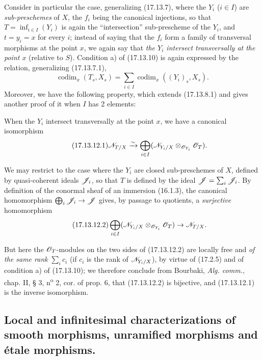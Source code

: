 \begin{env}[17.13.11]\label{IV.17.13.11}
Consider in particular the case, generalizing (17.13.7), where the $Y_i$ ($i\in I$) are \emph{sub-preschemes} of $X$, the $f_i$ being the canonical injections, so that $T=\inf_{i\in I}(Y_i)$ is again the ``intersection'' sub-prescheme of the $Y_i$, and $t=y_i=x$ for every $i$; instead of saying that the $f_i$ form a family of transversal morphisms at the point $x$, we again say that \emph{the $Y_i$ intersect transversally at the point $x$} (relative to $S$). Condition a) of (17.13.10) is again expressed by the relation, generalizing (17.13.7.1),
\[
\label{IV.17.13.11.1}
\tag{17.13.11.1}
\operatorname{codim}_x(T_s,X_s)=\sum_{i\in I}\operatorname{codim}_x((Y_i)_s,X_s).
\]
Moreover, we have the following property, which extends (17.13.8.1) and gives another proof of it when $I$ has 2 elements:
\end{env}

\begin{corollary}[17.13.12]
\label{IV.17.13.12}
When the $Y_i$ intersect transversally at the point $x$, we have a canonical isomorphism
\[
\label{IV.17.13.12.1}
\tag{17.13.12.1}
\mathscr{N}_{T/X}\xrightarrow{\sim}\bigoplus_{i\in I}(\mathscr{N}_{Y_i/X}\otimes_{\mathscr{O}_{Y_i}}\mathscr{O}_T).
\]
\end{corollary}

We may restrict to the case where the $Y_i$ are closed sub-preschemes of $X$, defined by quasi-coherent ideals $\mathscr{J}_i$, so that $T$ is defined by the ideal $\mathscr{J}=\sum_i\mathscr{J}_i$. By definition of the conormal sheaf of an immersion (16.1.3), the canonical homomorphism $\bigoplus_i\mathscr{J}_i\to\mathscr{J}$ gives, by passage to quotients, a \emph{surjective} homomorphism
\[
\label{IV.17.13.12.2}
\tag{17.13.12.2}
\bigoplus_{i\in I}(\mathscr{N}_{Y_i/X}\otimes_{\mathscr{O}_{Y_i}}\mathscr{O}_T)\to\mathscr{N}_{T/X}.
\]


But here the $\mathscr{O}_T$-modules on the two sides of (17.13.12.2) are locally free and \emph{of the same rank} $\sum_i c_i$ (if $c_i$ is the rank of $\mathscr{N}_{Y_i/X}$), by virtue of (17.2.5) and of condition a) of (17.13.10); we therefore conclude from Bourbaki, \emph{Alg. comm.}, chap. II, § 3, n\textsuperscript{o} 2, cor. of prop. 6, that (17.13.12.2) is bijective, and (17.13.12.1) is the inverse isomorphism.

\subsection{Local and infinitesimal characterizations of smooth morphisms, unramified morphisms and étale morphisms.}

